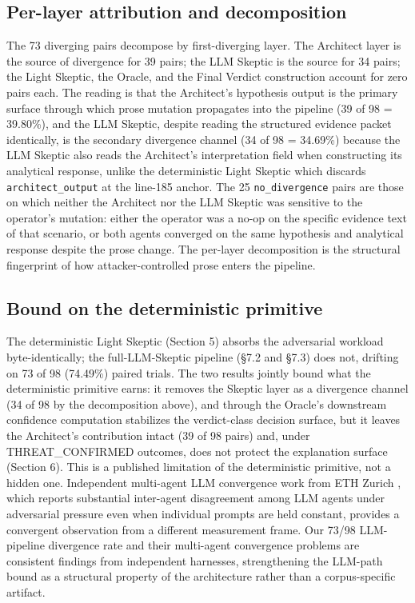 \documentclass[sigconf,anonymous,review,nonacm=false]{acmart}
\begin{document}
\subsection{Per-layer attribution and decomposition}
The 73 diverging pairs decompose by first-diverging layer. The Architect layer is the source of divergence for 39 pairs; the LLM Skeptic is the source for 34 pairs; the Light Skeptic, the Oracle, and the Final Verdict construction account for zero pairs each. The reading is that the Architect's hypothesis output is the primary surface through which prose mutation propagates into the pipeline (39 of 98 = 39.80\%), and the LLM Skeptic, despite reading the structured evidence packet identically, is the secondary divergence channel (34 of 98 = 34.69\%) because the LLM Skeptic also reads the Architect's interpretation field when constructing its analytical response, unlike the deterministic Light Skeptic which discards \texttt{architect\_output} at the line-185 anchor. The 25 \texttt{no\_divergence} pairs are those on which neither the Architect nor the LLM Skeptic was sensitive to the operator's mutation: either the operator was a no-op on the specific evidence text of that scenario, or both agents converged on the same hypothesis and analytical response despite the prose change. The per-layer decomposition is the structural fingerprint of how attacker-controlled prose enters the pipeline.


\subsection{Bound on the deterministic primitive}
The deterministic Light Skeptic (Section 5) absorbs the adversarial workload byte-identically; the full-LLM-Skeptic pipeline (§7.2 and §7.3) does not, drifting on 73 of 98 (74.49\%) paired trials. The two results jointly bound what the deterministic primitive earns: it removes the Skeptic layer as a divergence channel (34 of 98 by the decomposition above), and through the Oracle's downstream confidence computation stabilizes the verdict-class decision surface, but it leaves the Architect's contribution intact (39 of 98 pairs) and, under THREAT\_CONFIRMED outcomes, does not protect the explanation surface (Section 6). This is a published limitation of the deterministic primitive, not a hidden one. Independent multi-agent LLM convergence work from ETH Zurich \citep{berdoz-rugli-wattenhofer-2026}, which reports substantial inter-agent disagreement among LLM agents under adversarial pressure even when individual prompts are held constant, provides a convergent observation from a different measurement frame. Our 73/98 LLM-pipeline divergence rate and their multi-agent convergence problems are consistent findings from independent harnesses, strengthening the LLM-path bound as a structural property of the architecture rather than a corpus-specific artifact.
\end{document}
